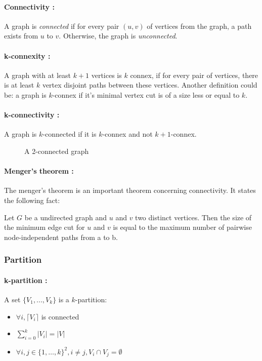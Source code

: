 \paragraph{Connectivity :}\label{defConnectivity}
A graph is {\em connected} if for every pair $(u,v)$ of vertices from the
graph, a path exists from $u$ to $v$. Otherwise, the graph is {\em unconnected}.

\paragraph{k-connexity :}
A graph with at least $k+1$ vertices is $k$ connex, if for every pair of
vertices, there is at least $k$ vertex disjoint paths between these vertices.
Another definition could be: a graph is $k$-connex if it's minimal vertex cut
is of a size less or equal to $k$.

\paragraph{k-connectivity :}
A graph is $k$-connected if it is $k$-connex and not $k+1$-connex. 

\begin{figure}[!h]
  \begin{center}
    
  \end{center}
  \caption{A 2-connected graph}
\end{figure}

\paragraph{Menger's theorem :}
The menger's theorem is an important theorem concerning connectivity.
It states the following fact:

Let $G$ be a undirected graph and $u$ and $v$ two distinct vertices.
Then the size of the minimum edge cut for $u$ and $v$ is equal to the maximum
number of pairwise node-independent paths from a to b.


\subsubsection{Partition}
\paragraph{k-partition :}
A set $\{V_1,...,V_k\}$ is a $k$-partition:
\begin{itemize}
    \item $\forall i, \lceil V_i \rceil$ is connected
    \item $\sum\limits_{i=0}^k|V_i| = |V|$
    \item $\forall i,j \in \{1, \dots, k\}^2, i \neq j, V_i \cap V_j = \emptyset$
\end{itemize}


